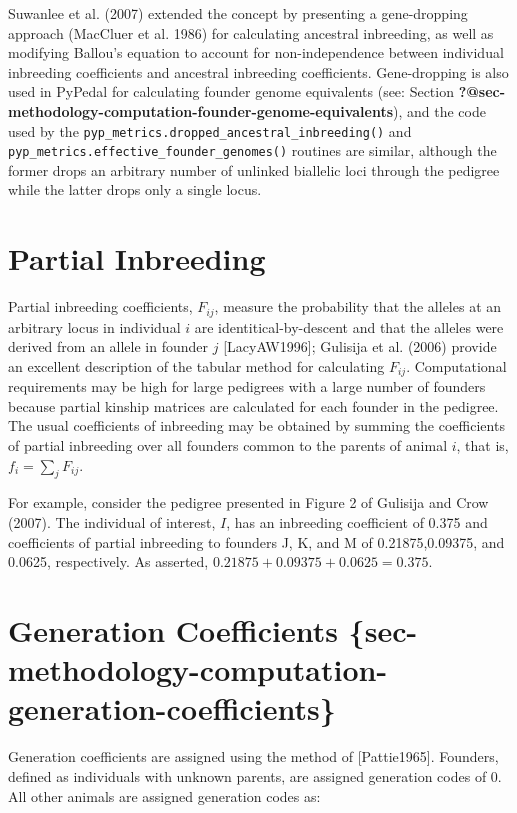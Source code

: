 \documentclass[
  letterpaper,
  DIV=11,
  numbers=noendperiod]{scrreprt}
\begin{document}
Suwanlee et al. (2007) extended the concept by presenting a
gene-dropping approach (MacCluer et al. 1986) for calculating ancestral
inbreeding, as well as modifying Ballou's equation to account for
non-independence between individual inbreeding coefficients and
ancestral inbreeding coefficients. Gene-dropping is also used in PyPedal
for calculating founder genome equivalents (see: Section
\textbf{?@sec-methodology-computation-founder-genome-equivalents}), and
the code used by the
\texttt{pyp\_metrics.dropped\_ancestral\_inbreeding()} and
\texttt{pyp\_metrics.effective\_founder\_genomes()} routines are
similar, although the former drops an arbitrary number of unlinked
biallelic loci through the pedigree while the latter drops only a single
locus.

\section{Partial Inbreeding}\label{sec-methodology-partial-inbreeding}

Partial inbreeding coefficients, \(F_{ij}\), measure the probability
that the alleles at an arbitrary locus in individual \(i\) are
identitical-by-descent and that the alleles were derived from an allele
in founder \(j\) {[}LacyAW1996{]}; Gulisija et al. (2006) provide an
excellent description of the tabular method for calculating \(F_{ij}\).
Computational requirements may be high for large pedigrees with a large
number of founders because partial kinship matrices are calculated for
each founder in the pedigree. The usual coefficients of inbreeding may
be obtained by summing the coefficients of partial inbreeding over all
founders common to the parents of animal \(i\), that is,
\(f_{i} = \sum_{j} F_{ij}\).

For example, consider the pedigree presented in Figure 2 of Gulisija and
Crow (2007). The individual of interest, \(I\), has an inbreeding
coefficient of 0.375 and coefficients of partial inbreeding to founders
J, K, and M of 0.21875,0.09375, and 0.0625, respectively. As asserted,
\(0.21875 + 0.09375 + 0.0625 = 0.375\).

\section{Generation Coefficients
\{sec-methodology-computation-generation-coefficients\}}\label{generation-coefficients-sec-methodology-computation-generation-coefficients}

Generation coefficients are assigned using the method of
{[}Pattie1965{]}. Founders, defined as individuals with unknown parents,
are assigned generation codes of 0. All other animals are assigned
generation codes as:
\end{document}

